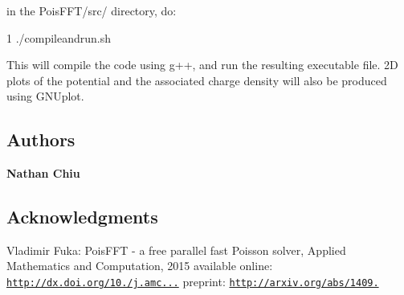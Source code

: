 \subsubsection*{}

in the Pois\+F\+F\+T/src/ directory, do\+:


\begin{DoxyCode}
1 ./compileandrun.sh
\end{DoxyCode}


This will compile the code using g++, and run the resulting executable file. 2D plots of the potential and the associated charge density will also be produced using G\+N\+Uplot.

\subsection*{Authors}


\begin{DoxyItemize}
\item {\bfseries Nathan Chiu}
\end{DoxyItemize}

\subsection*{Acknowledgments}


\begin{DoxyItemize}
\item Vladimir Fuka\+: Pois\+F\+FT -\/ a free parallel fast Poisson solver, Applied Mathematics and Computation, 2015 available online\+: \href{http://dx.doi.org/10.1016/j.amc.2015.03.011}{\tt http\+://dx.\+doi.\+org/10./j.\+amc...} preprint\+: \href{http://arxiv.org/abs/1409.8116}{\tt http\+://arxiv.\+org/abs/1409.} 
\end{DoxyItemize}